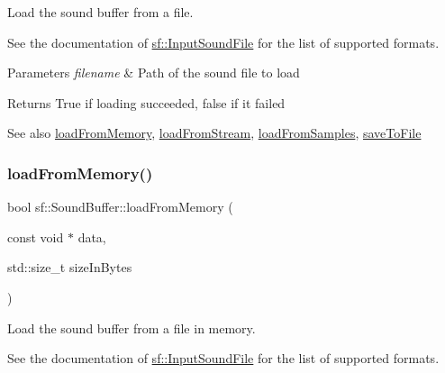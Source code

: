 Load the sound buffer from a file. 

See the documentation of \mbox{\hyperlink{classsf_1_1_input_sound_file}{sf\+::\+Input\+Sound\+File}} for the list of supported formats.


\begin{DoxyParams}{Parameters}
{\em filename} & Path of the sound file to load\\
\hline
\end{DoxyParams}
\begin{DoxyReturn}{Returns}
True if loading succeeded, false if it failed
\end{DoxyReturn}
\begin{DoxySeeAlso}{See also}
\mbox{\hyperlink{classsf_1_1_sound_buffer_af8cfa5599739a7edae69c5cba273d33f}{load\+From\+Memory}}, \mbox{\hyperlink{classsf_1_1_sound_buffer_ad292156b1e01f6dabd4c0c277d5e079e}{load\+From\+Stream}}, \mbox{\hyperlink{classsf_1_1_sound_buffer_a42d51ce4bb3b60c7ea06f63c273fd063}{load\+From\+Samples}}, \mbox{\hyperlink{classsf_1_1_sound_buffer_aade64260c6375580a085314a30be007e}{save\+To\+File}} \begin{DoxyVerb}\end{DoxyVerb}
 
\end{DoxySeeAlso}
\mbox{\label{classsf_1_1_sound_buffer_af8cfa5599739a7edae69c5cba273d33f}} 
\subsubsection{\texorpdfstring{loadFromMemory()}{loadFromMemory()}}
{\footnotesize\ttfamily bool sf\+::\+Sound\+Buffer\+::load\+From\+Memory (\begin{DoxyParamCaption}\item[{const void $\ast$}]{data,  }\item[{std\+::size\+\_\+t}]{size\+In\+Bytes }\end{DoxyParamCaption})}



Load the sound buffer from a file in memory. 

See the documentation of \mbox{\hyperlink{classsf_1_1_input_sound_file}{sf\+::\+Input\+Sound\+File}} for the list of supported formats.


